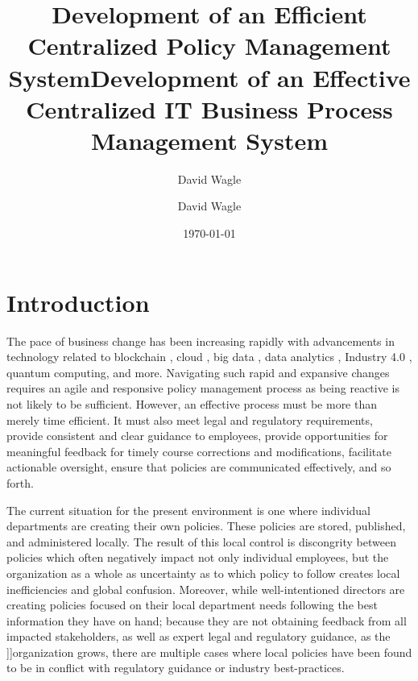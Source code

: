 \documentclass[stu]{apa7}
\title{Development of an Efficient Centralized Policy Management System}
\author{David Wagle}
\affiliation{School of Business, Northcentral University}
\author{David Wagle}
\date{\today}
\title{Development of an Effective Centralized IT Business Process Management System}
\begin{document}
\maketitle
\maketitle

\section{Introduction}
\label{sec:org1ea78cd}

The pace of business change has been increasing rapidly with advancements in technology related to blockchain \citep{caseBlockchainEmpiricalReview2020}, cloud \citep{nirenjenaCloudComputingRevolution2017}, big data \citep{trieuGettingValueBusiness2017}, data analytics \citep{dongBusinessValueBig2020}, Industry 4.0 \citep{sorooshianImpacts4thIndustrial2020}, quantum computing, and more. Navigating such rapid and expansive changes requires an agile and responsive policy management process \citep{agarwalaRolePolicyFramework2021} as being reactive is not likely to be sufficient. However, an effective process must be more than merely time efficient. It must also meet legal and regulatory requirements, provide consistent and clear guidance to employees, provide opportunities for meaningful feedback for timely course corrections and modifications, facilitate actionable oversight, ensure that policies are communicated effectively, and so forth.

The current situation for the present environment is one where individual departments are creating their own policies. These policies are stored, published, and administered locally. The result of this local control is discongrity between policies which often negatively impact not only individual employees, but the organization as a whole as uncertainty as to which policy to follow creates local inefficiencies and global confusion. Moreover, while well-intentioned directors are creating policies focused on their local department needs following the best information they have on hand; because they are not obtaining feedback from all impacted stakeholders, as well as expert legal and regulatory guidance, as the ]]organization grows, there are multiple cases where local policies have been found to be in conflict with regulatory guidance or industry best-practices.
\end{document}

